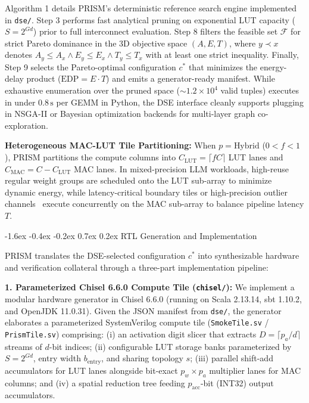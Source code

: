 \documentclass[10pt,letterpaper,twocolumn]{article}
\makeatletter
\renewcommand\section{\@startsection {section}{1}{\z@}%
  {-1.6ex \@plus -0.4ex \@minus -0.2ex}%
  {0.7ex \@plus 0.2ex}%
  {\normalfont\large\bfseries\color{primary}}}
\makeatother
\begin{document}
Algorithm 1 details PRISM's deterministic reference search engine implemented in \texttt{dse/}. Step 3 performs fast analytical pruning on exponential LUT capacity ($S = 2^{Gd}$) prior to full interconnect evaluation. Step 8 filters the feasible set $\mathcal{F}$ for strict Pareto dominance in the 3D objective space $(A, E, T)$, where $y \prec x$ denotes $A_y \le A_x \land E_y \le E_x \land T_y \le T_x$ with at least one strict inequality. Finally, Step 9 selects the Pareto-optimal configuration $c^*$ that minimizes the energy-delay product ($\text{EDP} = E \cdot T$) and emits a generator-ready manifest. While exhaustive enumeration over the pruned space ($\sim 1.2 \times 10^4$ valid tuples) executes in under $0.8\,\text{s}$ per GEMM in Python, the DSE interface cleanly supports plugging in NSGA-II or Bayesian optimization backends for multi-layer graph co-exploration.

\textbf{Heterogeneous MAC-LUT Tile Partitioning:} When $p = \text{Hybrid}$ ($0 < f < 1$), PRISM partitions the compute columns into $C_{\text{LUT}} = \lceil f C \rceil$ LUT lanes and $C_{\text{MAC}} = C - C_{\text{LUT}}$ MAC lanes. In mixed-precision LLM workloads, high-reuse regular weight groups are scheduled onto the LUT sub-array to minimize dynamic energy, while latency-critical boundary tiles or high-precision outlier channels~\cite{lin2024awq} execute concurrently on the MAC sub-array to balance pipeline latency $T$.

\section{RTL Generation and Implementation}
\label{sec:rtl}

PRISM translates the DSE-selected configuration $c^*$ into synthesizable hardware and verification collateral through a three-part implementation pipeline:

\textbf{1. Parameterized Chisel 6.6.0 Compute Tile (\texttt{chisel/}):} We implement a modular hardware generator in Chisel 6.6.0 (running on Scala 2.13.14, sbt 1.10.2, and OpenJDK 11.0.31). Given the JSON manifest from \texttt{dse/}, the generator elaborates a parameterized SystemVerilog compute tile (\texttt{SmokeTile.sv} / \texttt{PrismTile.sv}) comprising: (i) an activation digit slicer that extracts $D = \lceil p_a / d \rceil$ streams of $d$-bit indices; (ii) configurable LUT storage banks parameterized by $S=2^{Gd}$, entry width $b_{\text{entry}}$, and sharing topology $s$; (iii) parallel shift-add accumulators for LUT lanes alongside bit-exact $p_w \times p_a$ multiplier lanes for MAC columns; and (iv) a spatial reduction tree feeding $p_{\text{acc}}$-bit (INT32) output accumulators.
\end{document}
